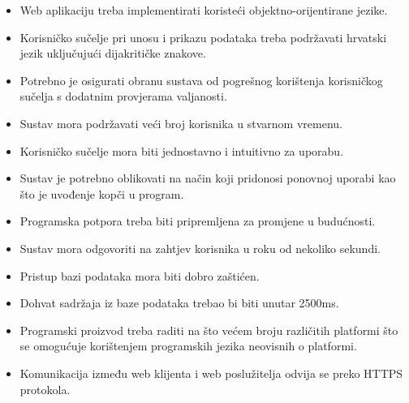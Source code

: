 			\begin{itemize}
				\item Web aplikaciju treba implementirati koristeći objektno-orijentirane jezike.
				\item Korisničko sučelje pri unosu i prikazu podataka treba podržavati hrvatski jezik uključujući dijakritičke znakove. 
				\item Potrebno je osigurati obranu sustava od pogrešnog korištenja korisničkog sučelja s dodatnim provjerama valjanosti.
				\item Sustav mora podržavati veći broj korisnika u stvarnom vremenu.
				\item Korisničko sučelje mora biti jednostavno i intuitivno za uporabu.
				\item Sustav je potrebno oblikovati na način koji pridonosi ponovnoj uporabi kao što je uvođenje kopči u program. 
				\item Programska potpora treba biti pripremljena za promjene u budućnosti. 
				\item Sustav mora odgovoriti na zahtjev korisnika u roku od nekoliko sekundi. 
				\item Pristup bazi podataka mora biti dobro zaštićen. 
				\item Dohvat sadržaja iz baze podataka trebao bi biti unutar 2500ms. 
				\item Programski proizvod treba raditi na što većem broju različitih platformi što se omogućuje korištenjem programskih jezika neovisnih o platformi.
				\item Komunikacija između web klijenta i web poslužitelja odvija se preko HTTPS protokola. 
			\end{itemize}
		 
			 
			 
			 
	